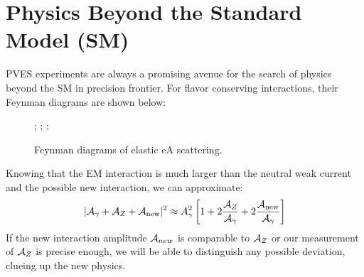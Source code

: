 \section{Physics Beyond the Standard Model (SM)} 
PVES experiments are always a promising avenue for the search of physics beyond the SM in precision frontier.
For flavor conserving interactions, their Feynman diagrams are shown below:
\begin{figure}[H]
    \centering
{};
;
;
    \caption{Feynman diagrams of elastic eA scattering.}
\end{figure}

Knowing that the EM interaction is much larger than the neutral weak current and
the possible new interaction, we can approximate:
\begin{equation}
    |\mathcal{A}_\gamma + \mathcal{A}_Z + \mathcal{A}_{\text{new}}|^2 \approx A^2_\gamma\left[ 1 + 2\frac{\mathcal{A}_Z}{\mathcal{A}_\gamma}
    + 2\frac{\mathcal{A}_{\text{new}}}{\mathcal{A}_\gamma} \right]
\end{equation}
If the new interaction amplitude $\mathcal{A}_{new}$ is comparable to $\mathcal{A}_Z$ or our measurement 
of $\mathcal{A}_Z$ is precise enough, we will be able to distinguish any possible deviation,
clueing up the new physics.

